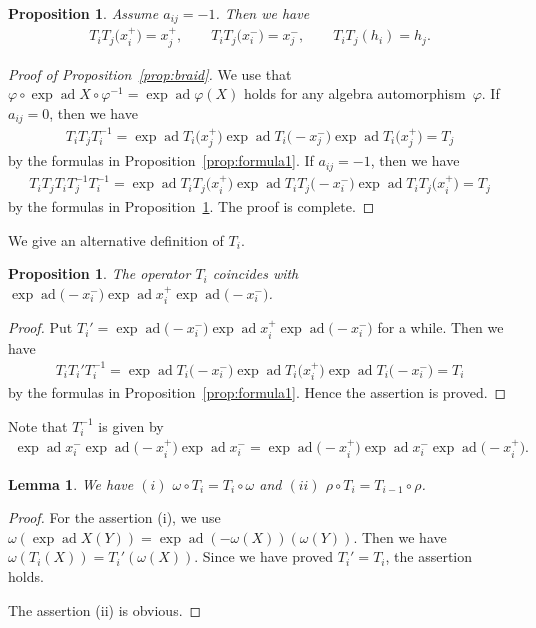 \documentclass[pdftex]{sigma}
\newtheorem{prop}[thm]{Proposition}
\newtheorem{lem}[thm]{Lemma}
\theoremstyle{definition}
\numberwithin{equation}{section}
\DeclareMathOperator{\ad}{ad}
\begin{document}
\begin{prop}\label{prop:iji_pre}Assume $a_{ij}=-1$. Then we have
\begin{gather*}
T_i T_j \big(x_i^+\big) = x_j^+,\qquad T_i T_j \big(x_i^-\big) = x_j^-,\qquad T_i T_j (h_i) = h_j.
\end{gather*}
\end{prop}

\begin{proof}[Proof of Proposition~\ref{prop:braid}] We use that $\varphi \circ \exp\ad X \circ \varphi^{-1} = \exp \ad \varphi(X)$ holds for any algebra automorphism~$\varphi$. If $a_{ij}=0$, then we have
\begin{gather*}
T_i T_j T_i^{-1} = \exp\ad T_i\big(x_j^+\big) \exp\ad T_i\big({-}x_j^-\big) \exp\ad T_i\big(x_j^+\big) = T_j
\end{gather*}
by the formulas in Proposition~\ref{prop:formula1}. If $a_{ij}=-1$, then we have
\begin{gather*}
T_i T_j T_i T_j^{-1} T_i^{-1} = \exp\ad T_i T_j \big(x_i^+\big) \exp\ad T_i T_j \big({-}x_i^-\big) \exp\ad T_i T_j \big(x_i^+\big) = T_j
\end{gather*}
by the formulas in Proposition~\ref{prop:iji_pre}. The proof is complete.
\end{proof}

We give an alternative definition of $T_i$.
\begin{prop}The operator $T_i$ coincides with $\exp\ad \big({-}x_i^{-}\big) \exp\ad x_i^{+} \exp\ad \big({-}x_i^{-}\big)$.
\end{prop}
\begin{proof}Put $T_i' = \exp\ad \big({-}x_i^{-}\big) \exp\ad x_i^{+} \exp\ad \big({-}x_i^{-}\big)$ for a while. Then we have
\begin{gather*}
T_i T_i' T_i^{-1} = \exp\ad T_i\big({-}x_i^{-}\big) \exp\ad T_i\big(x_i^+\big) \exp\ad T_i\big({-}x_i^{-}\big) = T_i
\end{gather*}
by the formulas in Proposition~\ref{prop:formula1}. Hence the assertion is proved.
\end{proof}

Note that $T_i^{-1}$ is given by
\begin{gather*}
\exp\ad x_i^- \exp\ad \big({-}x_i^+\big) \exp\ad x_i^- = \exp\ad \big({-}x_i^+\big) \exp\ad x_i^- \exp\ad \big({-}x_i^+\big).
\end{gather*}

\begin{lem}\label{lem:rho_omega_and_T} We have $(i)$ $\omega \circ T_i = T_{i} \circ \omega$ and $(ii)$ $\rho \circ T_i = T_{i-1} \circ \rho$.
\end{lem}
\begin{proof}For the assertion (i), we use $\omega (\exp\ad X (Y)) = \exp\ad(-\omega(X))(\omega(Y))$. Then we have $\omega(T_i(X))=T_i'(\omega(X))$. Since we have proved $T_i'=T_i$, the assertion holds.

The assertion (ii) is obvious.
\end{proof}
\end{document}
